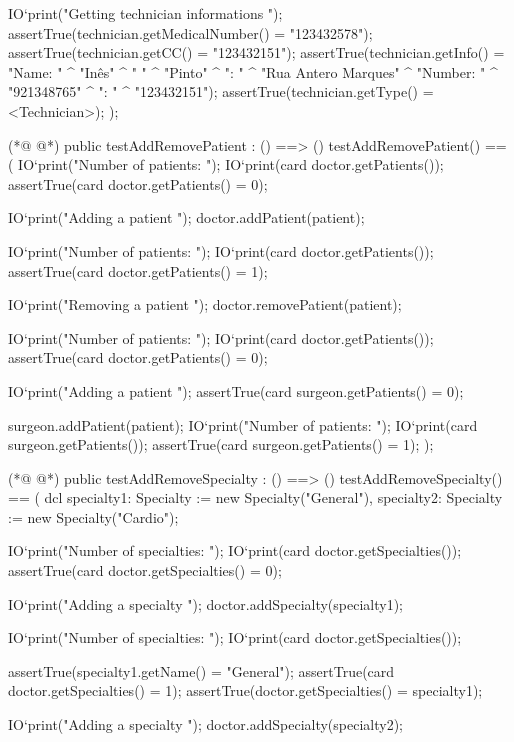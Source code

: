 \begin{vdmpp}[breaklines=true]
   IO`print("\n Getting technician informations \n");
   assertTrue(technician.getMedicalNumber() = "123432578");
   assertTrue(technician.getCC() = "123432151");
   assertTrue(technician.getInfo() = "Name: " ^ "Inês" ^ " " ^ "Pinto" ^ "\nAddress: " ^ "Rua Antero Marques" ^ "\nPhone Number: " ^ "921348765" ^ "\nCC: " ^ "123432151");
   assertTrue(technician.getType() = <Technician>);
  );
  
(*@
\label{testAddRemovePatient:45}
@*)
 public testAddRemovePatient : () ==> ()
  testAddRemovePatient() == (
   IO`print("\n Number of patients: ");
   IO`print(card doctor.getPatients());
   assertTrue(card doctor.getPatients() = 0);
   
   IO`print("\n Adding a patient \n");
   doctor.addPatient(patient);
   
   IO`print("\n Number of patients: ");
   IO`print(card doctor.getPatients());
   assertTrue(card doctor.getPatients() = 1);
   
   IO`print("\n Removing a patient \n");
   doctor.removePatient(patient);
   
   IO`print("\n Number of patients: ");
   IO`print(card doctor.getPatients());
   assertTrue(card doctor.getPatients() = 0);
   
   IO`print("\n Adding a patient \n");
   assertTrue(card surgeon.getPatients() = 0);
   
   surgeon.addPatient(patient);
   IO`print("\n Number of patients: ");
   IO`print(card surgeon.getPatients());
   assertTrue(card surgeon.getPatients() = 1);
  );
  
(*@
\label{testAddRemoveSpecialty:74}
@*)
 public testAddRemoveSpecialty : () ==> ()
  testAddRemoveSpecialty() == (
   dcl specialty1: Specialty := new Specialty("General"), specialty2: Specialty := new Specialty("Cardio");
   
   IO`print("\n Number of specialties: ");
   IO`print(card doctor.getSpecialties());
   assertTrue(card doctor.getSpecialties() = 0);
   
   IO`print("\n Adding a specialty \n");
   doctor.addSpecialty(specialty1);
   
   IO`print("\n Number of specialties: ");
   IO`print(card doctor.getSpecialties());
   
   assertTrue(specialty1.getName() = "General");
   assertTrue(card doctor.getSpecialties() = 1);
   assertTrue(doctor.getSpecialties() = {specialty1});
   
   IO`print("\n Adding a specialty \n");
   doctor.addSpecialty(specialty2);
   

\end{vdmpp}
